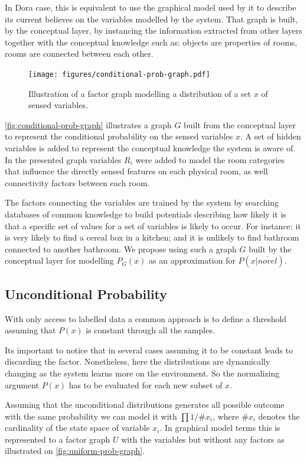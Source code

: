 \documentclass[runningheads,a4paper]{llncs}
\begin{document}
In Dora case, this is equivalent to use the graphical model used by it to describe its
current believes on the variables modelled by the system.
That graph is built, by the conceptual layer, by instancing the information extracted from
other layers together with the conceptual knowledge such as: objects are properties of rooms,
rooms are connected between each other.

\begin{figure}[h]
\centering
\texttt{[image: figures/conditional-prob-graph.pdf]}
\caption{\label{fig:conditional-prob-graph}Illustration of a factor graph modelling
         a distribution of a set $x$ of sensed variables.}
\end{figure}

\autoref{fig:conditional-prob-graph} illustrates a graph $G$ built from the conceptual
layer to represent the conditional probability on the sensed variables $x$.
A set of hidden variables is added to represent the conceptual knowledge the system is aware of.
In the presented graph variables $R_i$ were added to model the room categories that influence
the directly sensed features on each physical room, as well connectivity factors between each
room.

The factors connecting the variables are trained by the system by searching databases of
common knowledge to build potentials describing how likely it is that a specific set of
values for a set of variables is likely to occur.
For instance: it is very likely to find a cereal box in a kitchen; and it is unlikely to find
bathroom connected to another bathroom.
We propose using such a graph $G$ built by the conceptual layer for modelling $P_G(x)$
as an approximation for $P(x|\overline{novel})$.

\subsection{Unconditional Probability}
\label{sec:unconditional-prob}
With only access to labelled data a common approach is to define a threshold assuming
that $P(x)$ is constant through all the samples.

Its important to notice that in several cases assuming it to be constant leads to
discarding the factor.
Nonetheless, here the distributions are dynamically changing as the system learns
more on the environment.
So the normalizing argument $P(x)$ has to be evaluated for each new subset of $x$.

Assuming that the unconditional distributions generates all possible outcome with
the same probability we can model it with $\prod{1/\# x_i}$,
where $\# x_i$ denotes the cardinality of the state space of variable $x_i$.
In graphical model terms this is represented to a factor graph $U$ with the
variables but without any factors as illustrated on \autoref{fig:uniform-prob-graph}.
\end{document}
